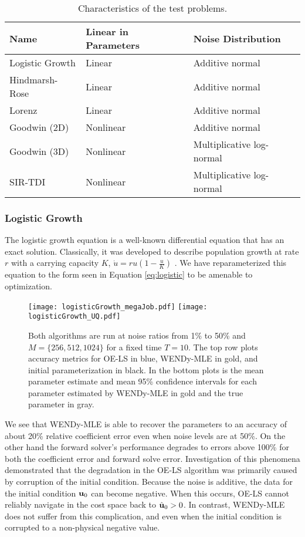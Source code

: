 \begin{table}[H]
    \centering
	\begin{tabular}{lll}
		\toprule	
		\rowcolor{white} \textbf{Name} & \textbf{Linear in Parameters} & \textbf{Noise Distribution} \\
		\midrule	
		\cellcolor{white} Logistic Growth &  Linear & Additive normal \\
		\cellcolor{white} Hindmarsh-Rose & Linear & Additive normal \\
		\cellcolor{white} Lorenz & Linear & Additive normal   \\
		\cellcolor{white} Goodwin (2D) &  Nonlinear & Additive normal   \\
		\cellcolor{white} Goodwin (3D) & Nonlinear & Multiplicative log-normal  \\
		\cellcolor{white} SIR-TDI & Nonlinear & Multiplicative log-normal   \\
		\bottomrule
	\end{tabular}
	\caption{Characteristics of the test problems.}
	\label{tab:odes-desc}
\end{table}

\subsubsection{Logistic Growth} \label{sec:logistic}

The logistic growth equation is a well-known differential equation that has an exact solution. Classically, it was developed to describe population growth at rate $r$ with a carrying capacity $K$, \(\dot{u} = ru(1-\tfrac{u}{K})\) \citep{Verhulst1838Correspondancemathematiqueetphysiquev10}. We have reparameterized this equation to the form seen in Equation \eqref{eq:logistic} to be amenable to optimization. 
\begin{figure}[H]
	\centering
	\texttt{[image: logisticGrowth\_megaJob.pdf]}
	\texttt{[image: logisticGrowth\_UQ.pdf]}
	\caption{Both algorithms are run at noise ratios from 1\% to 50\% and $M = \{256, 512, 1024\}$ for a fixed time $T=10$. The top row plots accuracy metrics for OE-LS in blue, WENDy-MLE in gold, and initial parameterization in black. In the bottom plots is the mean parameter estimate and mean 95\% confidence intervals for each parameter estimated by WENDy-MLE in gold and the true parameter in gray.}
	\label{fig:logisticMega}
\end{figure}
We see that WENDy-MLE is able to recover the parameters to an accuracy of about 20\% relative coefficient error even when noise levels are at 50\%. On the other hand the forward solver's performance degrades to errors above 100\% for both the coefficient error and forward solve error. Investigation of this phenomena demonstrated that the degradation in the OE-LS algorithm was primarily caused by corruption of the initial condition. Because the noise is additive, the data for the initial condition $\mathbf{u}_0$ can become negative. When this occurs, OE-LS cannot reliably navigate in the cost space back to $\hat{\mathbf{u}}_0 > 0$. In contrast, WENDy-MLE does not suffer from this complication, and even when the initial condition is corrupted to a non-physical negative value.

